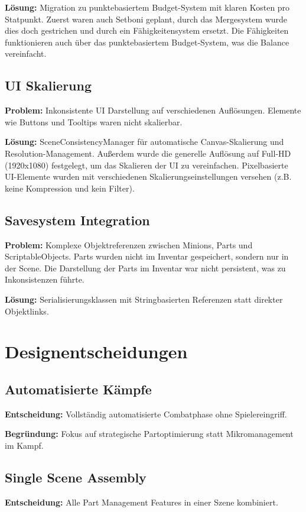 \textbf{Lösung:} Migration zu punktebasiertem Budget-System mit klaren Kosten pro Statpunkt. 
Zuerst waren auch Setboni geplant, durch das Mergesystem wurde dies doch gestrichen und durch ein Fähigkeitensystem ersetzt. 
Die Fähigkeiten funktionieren auch über das punktebasiertem Budget-System, was die Balance vereinfacht.

\subsection{UI Skalierung}
\textbf{Problem:} Inkonsistente UI Darstellung auf verschiedenen Auflösungen. Elemente wie Buttons und Tooltips waren nicht skalierbar. 


\textbf{Lösung:} SceneConsistencyManager für automatische Canvas-Skalierung und Resolution-Management.
Außerdem wurde die generelle Auflösung auf Full-HD (1920x1080) festgelegt, um das Skalieren der UI zu vereinfachen. 
Pixelbasierte UI-Elemente wurden mit verschiedenen Skalierungseinstellungen versehen (z.B. keine Kompression und kein Filter).

\subsection{Savesystem Integration}
\textbf{Problem:} Komplexe Objektreferenzen zwischen Minions, Parts und ScriptableObjects. Parts wurden nicht im Inventar gespeichert, sondern nur in der Scene. 
Die Darstellung der Parts im Inventar war nicht persistent, was zu Inkonsistenzen führte.

\textbf{Lösung:} Serialisierungsklassen mit Stringbasierten Referenzen statt direkter Objektlinks.

\section{Designentscheidungen}

\subsection{Automatisierte Kämpfe}
\textbf{Entscheidung:} Vollständig automatisierte Combatphase ohne Spielereingriff.

\textbf{Begründung:} Fokus auf strategische Partoptimierung statt Mikromanagement im Kampf.

\subsection{Single Scene Assembly}
\textbf{Entscheidung:} Alle Part Management Features in einer Szene kombiniert.

